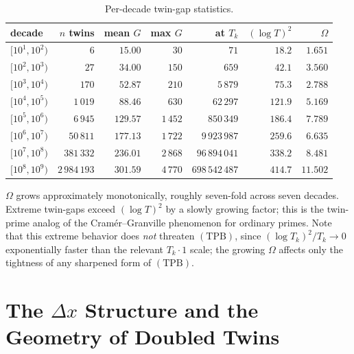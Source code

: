 \documentclass[11pt]{article}
\begin{document}
\begin{table}[h]
\centering
\caption{Per-decade twin-gap statistics.}\label{tab:decade}
\begin{tabular}{lrrrrrr}
\toprule
decade & $n$ twins & mean $G$ & max $G$ & at $T_k$ & $(\log T)^2$ & $\Omega$ \\
\midrule
$[10^1,10^2)$ & $6$ & $15.00$ & $30$ & $71$ & $18.2$ & $1.651$ \\
$[10^2,10^3)$ & $27$ & $34.00$ & $150$ & $659$ & $42.1$ & $3.560$ \\
$[10^3,10^4)$ & $170$ & $52.87$ & $210$ & $5\,879$ & $75.3$ & $2.788$ \\
$[10^4,10^5)$ & $1\,019$ & $88.46$ & $630$ & $62\,297$ & $121.9$ & $5.169$ \\
$[10^5,10^6)$ & $6\,945$ & $129.57$ & $1\,452$ & $850\,349$ & $186.4$ & $7.789$ \\
$[10^6,10^7)$ & $50\,811$ & $177.13$ & $1\,722$ & $9\,923\,987$ & $259.6$ & $6.635$ \\
$[10^7,10^8)$ & $381\,332$ & $236.01$ & $2\,868$ & $96\,894\,041$ & $338.2$ & $8.481$ \\
$[10^8,10^9)$ & $2\,984\,193$ & $301.59$ & $4\,770$ & $698\,542\,487$ & $414.7$ & $11.502$ \\
\bottomrule
\end{tabular}
\end{table}

$\Omega$ grows approximately monotonically, roughly seven-fold across
seven decades. Extreme twin-gaps exceed $(\log T)^2$ by a slowly
growing factor; this is the twin-prime analog of the
Cram\'er--Granville phenomenon for ordinary primes. Note that this
extreme behavior does \emph{not} threaten $(\mathrm{TPB})$, since
$(\log T_k)^2/T_k\to 0$ exponentially faster than the relevant
$T_k\cdot 1$ scale; the growing $\Omega$ affects only the tightness of
any sharpened form of $(\mathrm{TPB})$.


\section{The \texorpdfstring{$\Delta x$}{Delta x} Structure and the Geometry of Doubled Twins}\label{sec:deltax}
\end{document}
